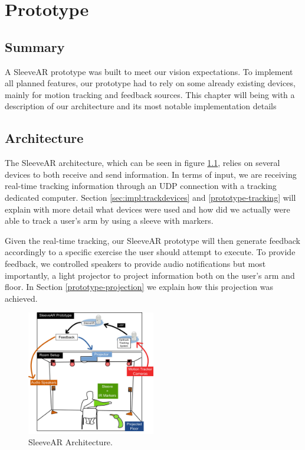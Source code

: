 \chapter{Prototype}
\label{sec:implementation}

\section*{Summary}
A SleeveAR prototype was built to meet our vision expectations. To implement all planned features, our prototype had to rely on some already existing devices, mainly for motion tracking and feedback sources. This chapter will being with a description of our architecture and its most notable implementation details






\section{Architecture}
\label{sec:impl:arch}

The SleeveAR architecture, which can be seen in figure \ref{fig:arch}, relies on several devices to both receive and send information.
In terms of input, we are receiving real-time tracking information through an UDP connection with a tracking dedicated computer. Section \ref{sec:impl:trackdevices} and \ref{prototype-tracking} will explain with more detail what devices were used and how did we actually were able to track a user's arm by using a sleeve with markers.

Given the real-time tracking, our SleeveAR prototype will then generate feedback accordingly to a specific exercise the user should attempt to execute. To provide feedback, we controlled speakers to provide audio notifications but most importantly, a light projector to project information both on the user's arm and floor. In Section \ref{prototype-projection} we explain how this projection was achieved.

\begin{figure}[!t]
    \begin{center}
        \includegraphics[width=0.5\textwidth]{imgs/impl/arch}
    \end{center}
    \caption{SleeveAR Architecture.}
    \label{fig:arch}
\end{figure}




